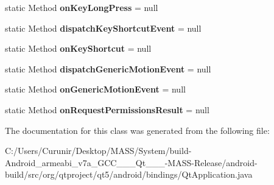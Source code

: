 \begin{DoxyCompactItemize}
$$static Method {\bfseries on\+Key\+Long\+Press} = null
\item 
\mbox{\label{classorg_1_1qtproject_1_1qt5_1_1android_1_1bindings_1_1_qt_application_aa2fb7f374d9a03d6b939375933ff5149}} 
static Method {\bfseries dispatch\+Key\+Shortcut\+Event} = null
\item 
\mbox{\label{classorg_1_1qtproject_1_1qt5_1_1android_1_1bindings_1_1_qt_application_a1ce0a33219f8c6103b216ed433ceeefe}} 
static Method {\bfseries on\+Key\+Shortcut} = null
\item 
\mbox{\label{classorg_1_1qtproject_1_1qt5_1_1android_1_1bindings_1_1_qt_application_a2c2d0ff311ded8aaa6dabdde99632a6c}} 
static Method {\bfseries dispatch\+Generic\+Motion\+Event} = null
\item 
\mbox{\label{classorg_1_1qtproject_1_1qt5_1_1android_1_1bindings_1_1_qt_application_a2ba7755a97e7fadf952401719ca1f8e4}} 
static Method {\bfseries on\+Generic\+Motion\+Event} = null
\item 
\mbox{\label{classorg_1_1qtproject_1_1qt5_1_1android_1_1bindings_1_1_qt_application_aac1ebcc15f869519f9d975f64e9cfb3f}} 
static Method {\bfseries on\+Request\+Permissions\+Result} = null
\end{DoxyCompactItemize}


The documentation for this class was generated from the following file\+:\begin{DoxyCompactItemize}
\item 
C\+:/\+Users/\+Curunir/\+Desktop/\+M\+A\+S\+S/\+System/build-\/\+Android\+\_\+armeabi\+\_\+v7a\+\_\+\+G\+C\+C\+\_\+\_\+\_\+\+Qt\+\_\+\_\+\_-\/\+M\+A\+S\+S-\/\+Release/android-\/build/src/org/qtproject/qt5/android/bindings/Qt\+Application.\+java\end{DoxyCompactItemize}
